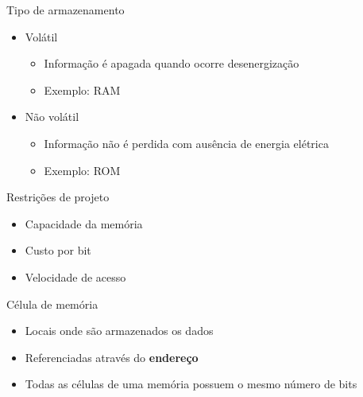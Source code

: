 \documentclass[aspectratio=169,
				xcolor=table]{beamer}
\begin{document}
	\begin{frame}{Tipo de armazenamento}
		\begin{itemize}
			\item Volátil
			\begin{itemize}
				\item Informação é apagada quando ocorre desenergização
				\item Exemplo: RAM
			\end{itemize}
			\vspace{1em}
			\item Não volátil
			\begin{itemize}
				\item Informação não é perdida com ausência de energia elétrica
				\item Exemplo: ROM	\end{itemize}
		\end{itemize}
	\end{frame}	
	
	\begin{frame}{Restrições de projeto}
		\begin{itemize}
			\item Capacidade da memória
			\vspace{1em}
			\item Custo por bit
			\vspace{1em}
			\item Velocidade de acesso
		\end{itemize}
	\end{frame}
	
	\begin{frame}{Célula de memória}
		\begin{itemize}
			\item Locais onde são armazenados os dados
			\vspace{1em}
			\item Referenciadas através do \textbf{endereço}
			\vspace{1em}
			\item Todas as células de uma memória possuem o mesmo número de bits

		\end{itemize}
	\end{frame}
	
\end{document}
